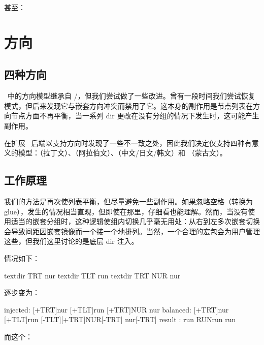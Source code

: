 甚至：

\begin{typing}
\newdimen\pdfeachlineheight
\newdimen\pdfeachlinedepth
\newdimen\pdflastlinedepth
\newdimen\pdffirstlineheight
\newdimen\pdfignoreddimen
\end{typing}

\section{方向}

\topicindex {\OMEGA}
\topicindex {\ALEPH}

\subsection{四种方向}

\LUATEX\ 中的方向模型继承自 \OMEGA/\ALEPH，但我们尝试做了一些改进。曾有一段时间我们尝试恢复模式，但后来发现它与嵌套方向冲突而禁用了它。这本身的副作用是节点列表在方向节点方面不再平衡，当一系列 dir 更改在没有分组的情况下发生时，这可能产生副作用。

在扩展 \PDF\ 后端以支持方向时发现了一些不一致之处，因此我们决定仅支持四种有意义的模型：（拉丁文）、（阿拉伯文）、（中文/日文/韩文）和 （蒙古文）。

\subsection{工作原理}

我们的方法是再次使列表平衡，但尽量避免一些副作用。如果忽略空格（转换为 glue），发生的情况相当直观，但即使在那里，仔细看也能理解。然而，当没有使用适当的嵌套分组时，这种逻辑使组内切换几乎毫无用处：从右到左多次嵌套切换会导致间距因嵌套镜像而一个接一个地排列。当然，一个合理的宏包会为用户管理这些，但我们这里讨论的是底层 dir 注入。

情况如下：

\begin{typing}
textdir TRT nur {textdir TLT run textdir TRT NUR} nur
\end{typing}

逐步变为：

\begin{typing}
injected: [+TRT]nur {[+TLT]run [+TRT]NUR} nur
balanced: [+TRT]nur {[+TLT]run [-TLT][+TRT]NUR[-TRT]} nur[-TRT]
result  : run {RUNrun } run
\end{typing}

而这个：

